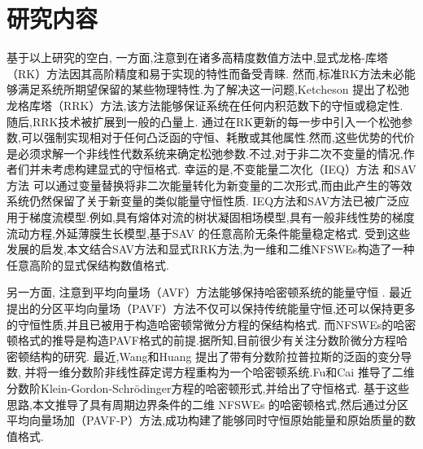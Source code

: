 \section{研究内容}
基于以上研究的空白, 
一方面,注意到在诸多高精度数值方法中,显式龙格-库塔（RK）方法因其高阶精度和易于实现的特性而备受青睐.
然而,标准RK方法未必能够满足系统所期望保留的某些物理特性.为了解决这一问题,Ketcheson \cite{ketchesonRelaxationRungeKutta2019} 提出了松弛龙格库塔（RRK）方法,该方法能够保证系统在任何内积范数下的守恒或稳定性.
随后,RRK技术被扩展到一般的凸量上\cite{ranochaRelaxationRungeKutta2020}.
通过在RK更新的每一步中引入一个松弛参数,可以强制实现相对于任何凸泛函的守恒、耗散或其他属性.然而,这些优势的代价是必须求解一个非线性代数系统来确定松弛参数.不过,对于非二次不变量的情况,作者们并未考虑构建显式的守恒格式.
幸运的是,不变能量二次化（IEQ）方法 \cite{yangLinearUnconditionallyEnergy2017, yangEfficientLinearSchemes2017} 和SAV方法 \cite{chengConvergenceEnergyconservingScheme2022} 可以通过变量替换将非二次能量转化为新变量的二次形式,而由此产生的等效系统仍然保留了关于新变量的类似能量守恒性质.
IEQ方法和SAV方法已被广泛应用于梯度流模型\cite{zhaoNumericalApproximationsPhase2017,shenScalarAuxiliaryVariable2018,liuExponentialScalarAuxiliary2020,chengMultipleScalarAuxiliary2018}.例如,具有熔体对流\cite{chenEfficientNumericalScheme2019}的树状凝固相场模型,具有一般非线性势的梯度流动方程\cite{yangConvergenceAnalysisInvariant2020},外延薄膜生长模型\cite{chengHighlyEfficientAccurate2019},基于SAV \cite{gongArbitrarilyHighorderUnconditionally2019}的任意高阶无条件能量稳定格式.
受到这些发展的启发,本文结合SAV方法和显式RRK方法,为一维和二维NFSWEs构造了一种任意高阶的显式保结构数值格式.

另一方面,
注意到平均向量场（AVF）方法能够保持哈密顿系统的能量守恒 \cite{quispelNewClassEnergypreserving2008}.%
最近提出的分区平均向量场（PAVF）方法不仅可以保持传统能量守恒,还可以保持更多的守恒性质,并且已被用于构造哈密顿常微分方程的保结构格式\cite{caiPartitionedAveragedVector2018}.
而NFSWEs的哈密顿格式的推导是构造PAVF格式的前提.据所知,目前很少有关注分数阶微分方程哈密顿结构的研究. 最近,Wang和Huang \cite{wangStructurepreservingNumericalMethods2018} 提出了带有分数阶拉普拉斯的泛函的变分导数,
并将一维分数阶非线性薛定谔方程重构为一个哈密顿系统.Fu和Cai \cite{fuStructurepreservingAlgorithmsTwodimensional2020} 推导了二维分数阶Klein-Gordon-Schr{\"o}dinger方程的哈密顿形式,并给出了守恒格式.
基于这些思路,本文推导了具有周期边界条件的二维 NFSWEs 的哈密顿格式,然后通过分区平均向量场加（PAVF-P）方法,成功构建了能够同时守恒原始能量和原始质量的数值格式.

